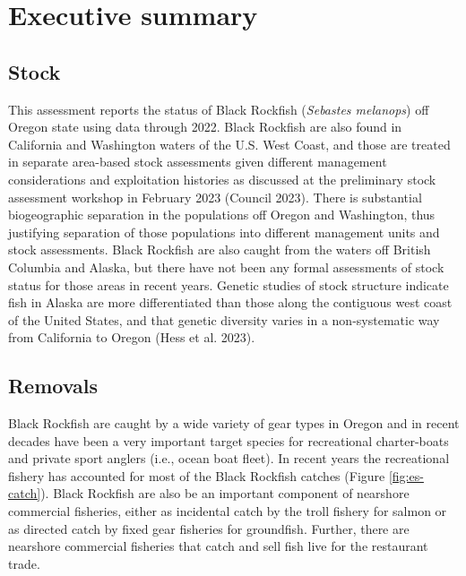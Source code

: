 \documentclass[11pt,
  letterpaper,
]{article}
\begin{document}
\newpage

\hypertarget{executive-summary}{%
\section*{Executive summary}\label{executive-summary}}

\hypertarget{stock}{%
\subsection*{Stock}\label{stock}}

This assessment reports the status of Black Rockfish (\emph{Sebastes melanops}) off Oregon state using data through 2022. Black Rockfish are also found in California and Washington waters of the U.S. West Coast, and those are treated in separate area-based stock assessments given different management considerations and exploitation histories as discussed at the preliminary stock assessment workshop in February 2023 (Council 2023). There is substantial biogeographic separation in the populations off Oregon and Washington, thus justifying separation of those populations into different management units and stock assessments. Black Rockfish are also caught from the waters off British Columbia and Alaska, but there have not been any formal assessments of stock status for those areas in recent years. Genetic studies of stock structure indicate fish in Alaska are more differentiated than those along the contiguous west coast of the United States, and that genetic diversity varies in a non-systematic way from California to Oregon (Hess et al. 2023).

\hypertarget{removals}{%
\subsection*{Removals}\label{removals}}

Black Rockfish are caught by a wide variety of gear types in Oregon and in recent decades have been a very important target species for recreational charter-boats and private sport anglers (i.e., ocean boat fleet). In recent years the recreational fishery has accounted for most of the Black Rockfish catches (Figure \ref{fig:es-catch}). Black Rockfish are also be an important component of nearshore commercial fisheries, either as incidental catch by the troll fishery for salmon or as directed catch by fixed gear fisheries for groundfish. Further, there are nearshore commercial fisheries that catch and sell fish live for the restaurant trade.
\end{document}

